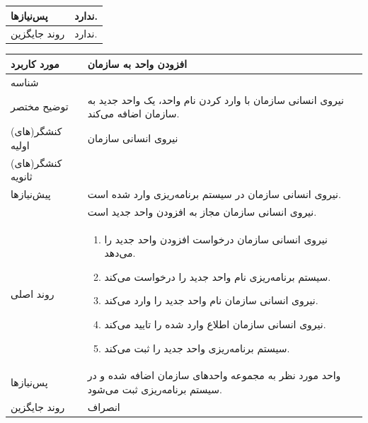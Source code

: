\begin{table}[H]
\begin{tabular}{|p{3cm}|p{10cm}|}
		پس‌نیازها &	ندارد. \\
		\hline
		
		روند جایگزین
		& ندارد. \\
		\hline
		
	\end{tabular}
\end{table}




\begin{table}[H]
	\centering
	\begin{tabular}{|p{3cm}|p{10cm}|}
		\hline
		
		
		مورد کاربرد	& افزودن واحد به سازمان  \\
		\hline
		
		شناسه & 
		\stepcounter{usecase_ID}
		
		\arabic{usecase_ID} \\
		
		\hline
		
		توضیح مختصر & نیروی انسانی سازمان با وارد کردن نام واحد، یک واحد جدید به سازمان اضافه می‌کند. \\
		\hline
		
		کنشگر(های) اولیه& نیروی انسانی سازمان \\
		\hline
		
		کنشگر(های) ثانویه&  \\
		\hline
		
		پیش‌نیازها
		& نیروی انسانی سازمان در سیستم برنامه‌ریزی وارد شده است.\\
		& نیروی انسانی سازمان مجاز به افزودن واحد جدید است. \\
		\hline
		
		
		روند اصلی &
		\begin{enumerate}[topsep=0cm,leftmargin=0.5cm]
			\item نیروی انسانی سازمان درخواست افزودن واحد جدید را می‌دهد.
			\item سیستم برنامه‌ریزی نام واحد جدید را درخواست می‌کند. 
			\item نیروی انسانی سازمان نام واحد جدید را وارد می‌کند. 
			\item نیروی انسانی سازمان اطلاع وارد شده را تایید می‌کند. 
			\item سیستم برنامه‌ریزی واحد جدید را ثبت می‌کند.
		\end{enumerate} \\
		\hline
		
		پس‌نیازها &
		واحد مورد نظر به مجموعه واحدهای سازمان اضافه شده و در سیستم برنامه‌ریزی ثبت می‌شود. \\
		\hline
		
		روند جایگزین
		& انصراف \\
		\hline
		
	\end{tabular}
\end{table}

